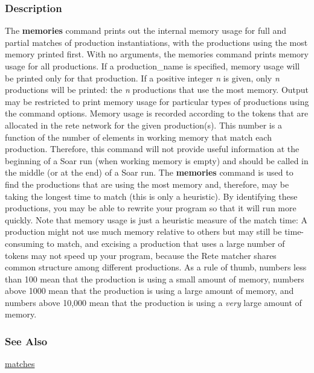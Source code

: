 \subsubsection*{Description}
 The \textbf{memories}
 command prints out the internal memory usage for full and partial matches of production instantiations, with the productions using the most memory printed first. With no arguments, the memories command prints memory usage for all productions. If a production\_name is specified, memory usage will be printed only for that production. If a positive integer \emph{n}
 is given, only \emph{n}
 productions will be printed: the \emph{n}
 productions that use the most memory. Output may be restricted to print memory usage for particular types of productions using the command options. 
 Memory usage is recorded according to the tokens that are allocated in the rete network for the given production(s). This number is a function of the number of elements in working memory that match each production. Therefore, this command will not provide useful information at the beginning of a Soar run (when working memory is empty) and should be called in the middle (or at the end) of a Soar run. 
 The \textbf{memories}
 command is used to find the productions that are using the most memory and, therefore, may be taking the longest time to match (this is only a heuristic). By identifying these productions, you may be able to rewrite your program so that it will run more quickly. Note that memory usage is just a heuristic measure of the match time: A production might not use much memory relative to others but may still be time-consuming to match, and excising a production that uses a large number of tokens may not speed up your program, because the Rete matcher shares common structure among different productions. 
 As a rule of thumb, numbers less than 100 mean that the production is using a small amount of memory, numbers above 1000 mean that the production is using a large amount of memory, and numbers above 10,000 mean that the production is using a \emph{very}
 large amount of memory. 
\subsubsection*{See Also}
\hyperref[matches]{matches} 